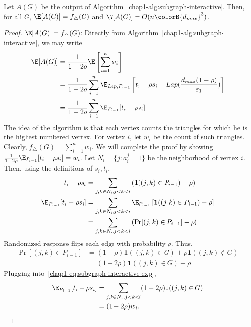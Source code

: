 
\begin{lemma}\label{chap1-lem:subgraph-interactive-perf}
  Let $A(G)$ be the output of Algorithm~\ref{chap1-alg:subgraph-interactive}. 
  Then, for all $G$, $\E[A(G)] =
  f_\triangle(G)$ and $\V[A(G)] = O(n\colorB{d_{max}}^3)$.
\end{lemma}
\begin{proof}
  \noindent 
  \textbf{$\E[A(G)] = f_\triangle(G)$}:
  Directly from Algorithm~\ref{chap1-alg:subgraph-interactive}, we may write
  \begin{align*}
    \E[A(G)] &= \frac{1}{1-2\rho}\E\left[\sum_{i=1}^n w_i\right] \\
    &= \frac{1}{1-2\rho}\sum_{i=1}^n
    \E_{Lap, P_{i-1}}\left[t_i - \rho s_i +
    Lap(\frac{d_{max}(1-\rho)}{\varepsilon_1})\right] \\
    &= \frac{1}{1-2\rho}\sum_{i=1}^n
    \E_{P_{i-1}} [t_i - \rho s_i]
  \end{align*}
  The idea of the algorithm is that each vertex counts the triangles for which
  he is the highest numbered vertex. For vertex $i$, let $w_i$ be the count of
  such triangles. Clearly, $f_\triangle(G) = \sum_{i=1}^n w_i$. We will complete the proof
  by showing $\frac{1}{1-2\rho}\E_{P_{i-1}} [t_i - \rho s_i] = w_i$. 
  Let $N_i = \{j : a_i^j = 1\}$ 
  be the neighborhood of vertex $i$. Then, using the definitions of $s_i, t_i$,
  \begin{align}
    t_i - \rho s_i &= \sum_{j,k \in N_i, j<k<i}\left(\textbf{1}((j,k) \in
    P_{i-1}) - \rho\right) \label{chap1-eq:subgraph-interactive-tri} \\
    \E_{P_{i-1}}[t_i - \rho s_i] &= \sum_{j,k \in N_i, j<k<i} \E_{P_{i-1}}\left[\textbf{1}( (j,k)
    \in P_{i-1}) - \rho\right] \nonumber \\
    &= \sum_{j,k \in N_i, j<k<i} \left( \Pr[(j,k) \in P_{i-1}] - \rho
    \right)\label{chap1-eq:subgraph-interactive-exp}
  \end{align}
  Randomized response flips each edge with probability $\rho$. Thus,
  \begin{align*}
    \Pr[(j,k) \in P_{i-1}]
    &= (1-\rho) \textbf{1}( (j,k) \in G ) + \rho
    \textbf{1}( (j,k) \notin G) \\
    &= (1-2\rho) \textbf{1}( (j,k) \in G) + \rho
  \end{align*}
  Plugging into~\eqref{chap1-eq:subgraph-interactive-exp}, 
  \begin{align*}
    \E_{P_{i-1}}[t_i - \rho s_i] &= \sum_{j,k \in N_i, j<k<i} (1-2\rho)
    \textbf{1}( (j,k) \in G) \\ &= (1-2\rho) w_i.
  \end{align*}


\end{proof}
